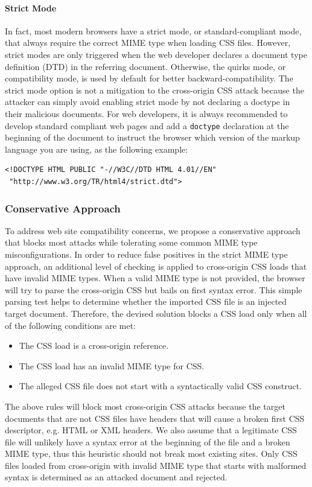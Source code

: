 \documentclass{acm_proc_article-sp}
\begin{document}
\paragraph{Strict Mode}
In fact, most modern browsers have a strict mode, or standard-compliant mode, that always require the correct MIME type when loading CSS files. However, strict modes are only triggered when the web developer declares a document type definition (DTD) in the referring document. Otherwise, the quirks mode, or compatibility mode, is used by default for better backward-compatibility. The strict mode option is not a mitigation to the cross-origin CSS attack because the attacker can simply avoid enabling strict mode by not declaring a doctype in their malicious documents. For web developers, it is always recommended to develop standard compliant web pages and add a \texttt{doctype} declaration at the beginning of the document to instruct the browser which version of the markup language you are using, as the following example:

\begin{verbatim}
<!DOCTYPE HTML PUBLIC "-//W3C//DTD HTML 4.01//EN"
 "http://www.w3.org/TR/html4/strict.dtd">
\end{verbatim}

\subsubsection{Conservative Approach}
To address web site compatibility concerns, we propose a conservative approach that blocks most attacks while tolerating some common MIME type misconfigurations. In order to reduce false positives in the strict MIME type approach, an additional level of checking is applied to cross-origin CSS loads that have invalid MIME types. When a valid MIME type is not provided, the browser will try to parse the cross-origin CSS but bails on first syntax error. This simple parsing test helps to determine whether the imported CSS file is an injected target document. Therefore, the devised solution blocks a CSS load only when all of the following conditions are met:
\begin{itemize}
\item{The CSS load is a cross-origin reference.}
\item{The CSS load has an invalid MIME type for CSS.}
\item{The alleged CSS file does not start with a syntactically valid CSS construct.}
\end{itemize}
The above rules will block most cross-origin CSS attacks because the target documents that are not CSS files have headers that will cause a broken first CSS descriptor, e.g. HTML or XML headers. We also assume that a legitimate CSS file will unlikely have a syntax error at the beginning of the file and a broken MIME type, thus this heuristic should not break most existing sites. Only CSS files loaded from cross-origin with invalid MIME type that starts with malformed syntax is determined as an attacked document and rejected.
\end{document}

